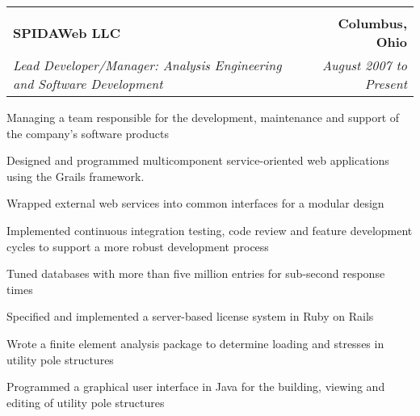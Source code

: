 \begin{tabular*}{6.6in}{@{\extracolsep{\fill}}lr}
\vspace{-3mm} & \\
\textbf{SPIDAWeb LLC} & \textbf{Columbus, Ohio}\\
\textit{Lead Developer/Manager: Analysis Engineering and Software Development} & \textit{August 2007 to Present}\\
\end{tabular*}
\begin{compactitem}
\item Managing a team responsible for the development, maintenance and support of the company's software products
\item Designed and programmed multicomponent service-oriented web applications using the Grails framework.
\item Wrapped external web services into common interfaces for a modular design
\item Implemented continuous integration testing, code review and feature development cycles to support a more robust development process
\item Tuned databases with more than five million entries for sub-second response times
\item Specified and implemented a server-based license system in Ruby on Rails
\item Wrote a finite element analysis package to determine loading and stresses in utility pole structures
\item Programmed a graphical user interface in Java for the building, viewing and editing of utility pole structures\medskip
\end{compactitem}
